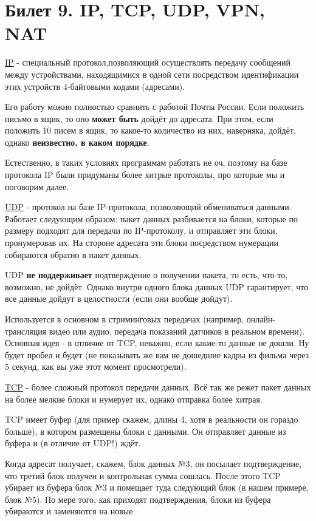 \newpage
\section {Билет 9. IP, TCP, UDP, VPN, NAT}

\href{https://ru.wikipedia.org/wiki/IP}{IP} - специальный протокол,позволяющий осуществлять передачу сообщений между устройствами, находящимися в одной сети посредством идентификации этих устройств 4-байтовыми кодами (адресами).

Его работу можно полностью сравнить с работой Почты России. Если положить письмо в ящик, то оно \textbf{может быть} дойдёт до адресата. При этом, если положить 10 писем в ящик, то какое-то количество из них, наверняка, дойдёт, однако \textbf{неизвестно, в каком порядке}.

Естественно, в таких условиях программам работать не оч, поэтому на базе протокола IP были придуманы более хитрые протоколы, про которые мы и поговорим далее.

\bigskip
\href{https://ru.wikipedia.org/wiki/UDP}{UDP} - протокол на базе IP-протокола, позволяющий обмениваться данными. Работает следующим образом: пакет данных разбивается на блоки, которые по размеру подходят для передачи по IP-протоколу, и отправляет эти блоки, пронумеровав их. На стороне адресата эти блоки посредством нумерации собираются обратно в пакет данных.

UDP \textbf{не поддерживает} подтверждение о получении пакета, то есть, что-то, возможно, не дойдёт. Однако внутри одного блока данных UDP гарантирует, что все данные дойдут в целостности (если они вообще дойдут).

Используется в основном в стриминговых передачах (например, онлайн-трансляция видео или аудио, передача показаний датчиков в реальном времени). Основная идея - в отличие от TCP, неважно, если какие-то данные не дошли. Ну будет пробел и будет (не показывать же вам не дошедшие кадры из фильма через 5 секунд, как вы уже этот момент просмотрели).

\bigskip
\href{https://ru.wikipedia.org/wiki/Transmission_Control_Protocol}{TCP} - более сложный протокол передачи данных. Всё так же режет пакет данных на более мелкие блоки и нумерует их, однако отправка более хитрая.

TCP имеет буфер (для пример скажем, длины 4, хотя в реальности он гораздо больше), в котором размещены блоки с данными. Он отправляет данные из буфера и (в отличие от UDP!) ждёт.

Когда адресат получает, скажем, блок данных №3, он посылает подтверждение, что третий блок получен и контрольная сумма сошлась. После этого TCP убирает из буфера блок №3 и помещает туда следующий блок (в нашем примере, блок №5). По мере того, как приходят подтверждения, блоки из буфера убираются и заменяются на новые.

